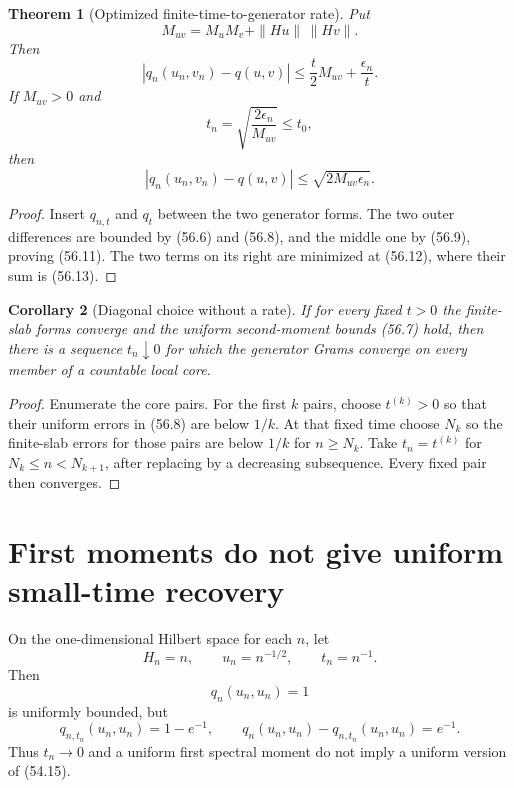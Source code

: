\documentclass[11pt]{article}
\newtheorem{theorem}{Theorem}[section]
\newtheorem{corollary}[theorem]{Corollary}
\theoremstyle{remark}
\begin{document}
\begin{theorem}[Optimized finite-time-to-generator rate]
\label{thm:v15v56-balance}
Put
\[
 M_{uv}=M_uM_v+\|Hu\|\,\|Hv\|.                          \tag{56.10}
\]
Then
\[
 |q_n(u_n,v_n)-q(u,v)|
 \leq\frac t2M_{uv}+\frac{\epsilon_n}{t}.               \tag{56.11}
\]
If \(M_{uv}>0\) and
\[
 t_n=\sqrt{\frac{2\epsilon_n}{M_{uv}}}\leq t_0,         \tag{56.12}
\]
then
\[
 \boxed{
 |q_n(u_n,v_n)-q(u,v)|
 \leq\sqrt{2M_{uv}\epsilon_n}.}                         \tag{56.13}
\]
\end{theorem}

\begin{proof}
Insert \(q_{n,t}\) and \(q_t\) between the two generator forms.
The two outer differences are bounded by (56.6) and (56.8), and the
middle one by (56.9), proving (56.11).  The two terms on its right
are minimized at (56.12), where their sum is (56.13).
\end{proof}

\begin{corollary}[Diagonal choice without a rate]
\label{cor:v15v56-diagonal}
If for every fixed \(t>0\) the finite-slab forms converge and the
uniform second-moment bounds (56.7) hold, then there is a sequence
\(t_n\downarrow0\) for which the generator Grams converge on every
member of a countable local core.
\end{corollary}

\begin{proof}
Enumerate the core pairs.  For the first \(k\) pairs, choose
\(t^{(k)}>0\) so that their uniform errors in (56.8) are below
\(1/k\).  At that fixed time choose \(N_k\) so the finite-slab
errors for those pairs are below \(1/k\) for \(n\geq N_k\).  Take
\(t_n=t^{(k)}\) for \(N_k\leq n<N_{k+1}\), after replacing by a
decreasing subsequence.  Every fixed pair then converges.
\end{proof}

\section{First moments do not give uniform small-time recovery}

\begin{countertheorem}
\label{cth:v15v56-first-not-second}
On the one-dimensional Hilbert space for each \(n\), let
\[
 H_n=n,\qquad u_n=n^{-1/2},\qquad t_n=n^{-1}.            \tag{56.14}
\]
Then
\[
 q_n(u_n,u_n)=1                                         \tag{56.15}
\]
is uniformly bounded, but
\[
 q_{n,t_n}(u_n,u_n)=1-e^{-1},\qquad
 q_n(u_n,u_n)-q_{n,t_n}(u_n,u_n)=e^{-1}.                \tag{56.16}
\]
Thus \(t_n\to0\) and a uniform first spectral moment do not imply a
uniform version of (54.15).
\end{countertheorem}
\end{document}
